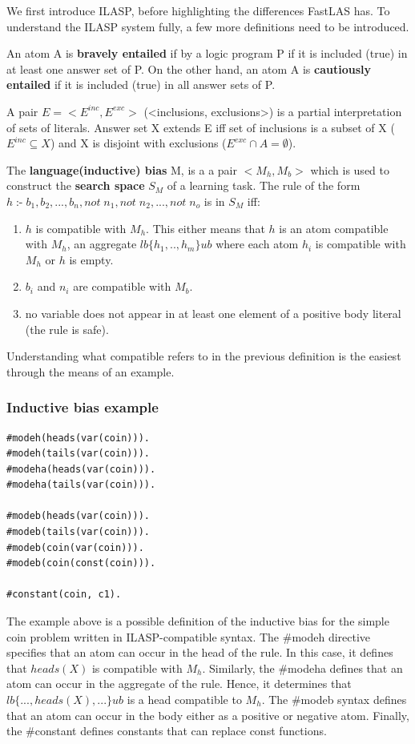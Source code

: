 We first introduce ILASP, before highlighting the differences FastLAS has.
To understand the ILASP system fully, a few more definitions need to be introduced.

An atom A is \textbf{bravely entailed} if by a logic program P if it is included (true) in at least one answer set of P. 
On the other hand, an atom A is \textbf{cautiously entailed} if it is included (true) in all answer sets of P.

A pair $E = <E^{inc}, E^{exc}>$ (<inclusions, exclusions>) is a partial interpretation of sets of literals.
Answer set X extends E iff set of inclusions is a subset of X ($E^{inc} \subseteq X$) and X is disjoint with exclusions ($E^{exc} \cap A = \emptyset$).


The \textbf{language(inductive) bias} M, is a a pair $<M_h, M_b>$ which is used to construct the \textbf{search space} $S_M$ of a learning task.
The rule of the form  \\$ h \;\text{:-} \; b_1, b_2, ..., b_n, not\; n_1, not\; n_2, ..., not\; n_o$ is in $S_M$ iff:
\begin{enumerate}
    \item $h$ is compatible with $M_h$. This either means that $h$ is an atom compatible with $M_h$, an aggregate $lb\{h_1,.., h_m\}ub$ where each atom $h_i$ is compatible with $M_h$ or $h$ is empty.
    \item $b_i$ and $n_i$ are compatible with $M_b$.
    \item no variable does not appear in at least one element  of a positive body literal (the rule is safe). \\ 
\end{enumerate}
Understanding what compatible refers to in the previous definition is the easiest through the means of an example.

\subsubsection{Inductive bias example}
\begin{verbatim}
#modeh(heads(var(coin))).
#modeh(tails(var(coin))).
#modeha(heads(var(coin))).
#modeha(tails(var(coin))).

#modeb(heads(var(coin))).
#modeb(tails(var(coin))).
#modeb(coin(var(coin))).
#modeb(coin(const(coin))).

#constant(coin, c1).
\end{verbatim}

The example above is a possible definition of the inductive bias for the simple coin problem written in ILASP-compatible syntax.
The \#modeh directive specifies that an atom can occur in the head of the rule. In this case, it defines that $heads(X)$ is compatible with $M_h$.
Similarly, the \#modeha defines that an atom can occur in the aggregate of the rule. Hence, it determines that  $lb\{..., heads(X), ...\}ub$ is a head compatible to $M_h$.
The \#modeb syntax defines that an atom can occur in the body either as a positive or negative atom.
Finally, the \#constant defines constants that can replace const functions.

